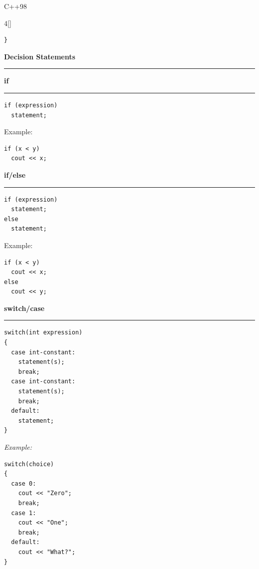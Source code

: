 \documentclass[final]{beamer}
\renewcommand{\subsection}[1]{%
  \par\vspace{1em}%
  {\noindent\large\bfseries #1\par}%
  \vspace{0.5em}\hrule\vspace{1em}%
}
\begin{document}
\begin{frame}[t,fragile]{C++98}
\begin{multicols}{4}[\setlength{\columnsep}{1.5cm}]
\begin{lstlisting}
}
\end{lstlisting}






\vspace{-1.5cm}
 \subsection{ Decision Statements}
\vspace{-1.5cm}



 
\subsection{if}
\begin{lstlisting}
if (expression)
  statement;
\end{lstlisting}
Example:
\begin{lstlisting}
if (x < y)
  cout << x;
\end{lstlisting}




 
\subsection{if/else}
\begin{lstlisting}
if (expression)
  statement;
else
  statement;
\end{lstlisting}
Example:
\begin{lstlisting}
if (x < y)
  cout << x;
else
  cout << y;
\end{lstlisting}

 
\subsection{switch/case}
\begin{lstlisting}
switch(int expression)
{
  case int-constant:
    statement(s);
    break;
  case int-constant:
    statement(s);
    break;
  default:
    statement;
}
\end{lstlisting}
{\it Example:}
\begin{lstlisting}
switch(choice)
{ 
  case 0:
    cout << "Zero";
    break;
  case 1:
    cout << "One";
    break;
  default:
    cout << "What?";
}
\end{lstlisting}


\end{multicols}
\end{frame}
\end{document}
